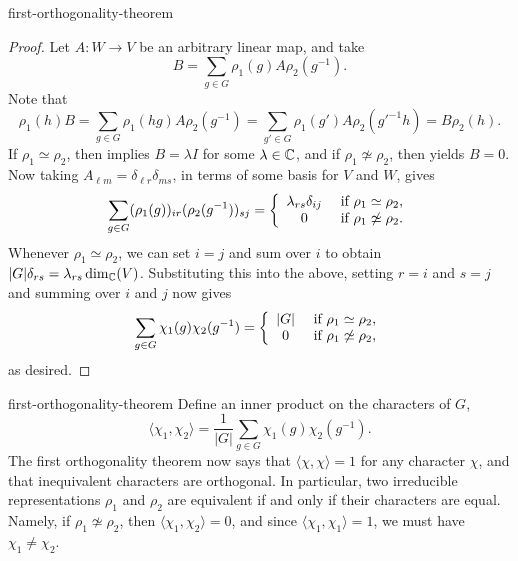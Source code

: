 \begin{example}{first-orthogonality-theorem}
    \begin{proof}
        Let $A : W \to V$ be an arbitrary linear map, and take
        \[ B = \sum_{g \in G} \rho_1(g) A \rho_2(g^{-1}) . \]
        Note that
        \[ \rho_1(h) B = \sum_{g \in G} \rho_1(hg) A \rho_2(g^{-1}) = \sum_{g' \in G} \rho_1(g') A \rho_2(g'^{-1} h) = B \rho_2(h) . \]
        If $\rho_1 \simeq \rho_2$, then  implies $B = \lambda I$ for some $\lambda \in \mathbb{C}$, and if $\rho_1 \not\simeq \rho_2$, then  yields $B = 0$. Now taking $A_{\ell m} = \delta_{\ell r} \delta_{ms}$, in terms of some basis for $V$ and $W$, gives
        \[ \sum_{g \in G} (\rho_1(g))_{ir} (\rho_2(g^{-1}))_{sj} = \left\{ \begin{array}{cl} \lambda_{rs} \delta_{ij} & \textup{ if } \rho_1 \simeq \rho_2 , \\ 0 & \textup{ if } \rho_1 \not\simeq \rho_2 . \end{array} \right. \]
        Whenever $\rho_1 \simeq \rho_2$, we can set $i = j$ and sum over $i$ to obtain $|G| \delta_{rs} = \lambda_{rs} \dim_{\mathbb{C}}(V)$. Substituting this into the above, setting $r = i$ and $s = j$ and summing over $i$ and $j$ now gives
        \[ \sum_{g \in G} \chi_1(g) \chi_2(g^{-1}) = \left\{ \begin{array}{cl} |G| & \textup{ if } \rho_1 \simeq \rho_2 , \\ 0 & \textup{ if } \rho_1 \not\simeq \rho_2 , \end{array} \right. \]
        as desired.
    \end{proof}
\end{example}

\begin{example}{first-orthogonality-theorem}
    Define an inner product on the characters of $G$,
    \[ \langle \chi_1, \chi_2 \rangle = \frac{1}{|G|} \sum_{g \in G} \chi_1(g) \chi_2(g^{-1}) . \]
    The first orthogonality theorem now says that $\langle \chi, \chi \rangle = 1$ for any character $\chi$, and that inequivalent characters are orthogonal. In particular, two irreducible representations $\rho_1$ and $\rho_2$ are equivalent if and only if their characters are equal. Namely, if $\rho_1 \not\simeq \rho_2$, then $\langle \chi_1, \chi_2 \rangle = 0$, and since $\langle \chi_1, \chi_1 \rangle = 1$, we must have $\chi_1 \ne \chi_2$.
\end{example}
